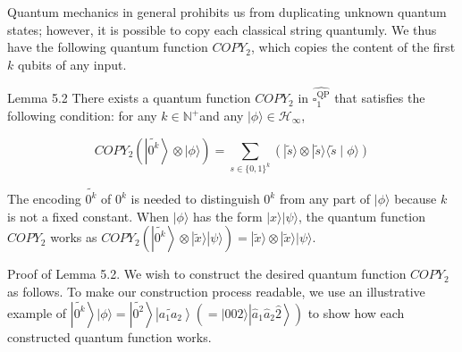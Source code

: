 \documentclass[10pt]{article}
\begin{document}
Quantum mechanics in general prohibits us from duplicating unknown quantum states; however, it is possible to copy each classical string quantumly. We thus have the following quantum function $C O P Y_{2}$, which copies the content of the first $k$ qubits of any input.

Lemma 5.2 There exists a quantum function $C O P Y_{2}$ in $\widehat{\square_{1}^{\mathrm{QP}}}$ that satisfies the following condition: for any $k \in \mathbb{N}^{+}$and any $|\phi\rangle \in \mathcal{H}_{\infty}$,

$$
C O P Y_{2}\left(\left|\widetilde{0^{k}}\right\rangle \otimes|\phi\rangle\right)=\sum_{s \in\{0,1\}^{k}}(|\tilde{s}\rangle \otimes|\tilde{s}\rangle\langle\tilde{s} \mid \phi\rangle)
$$

The encoding $\widetilde{0^{k}}$ of $0^{k}$ is needed to distinguish $0^{k}$ from any part of $|\phi\rangle$ because $k$ is not a fixed constant. When $|\phi\rangle$ has the form $|x\rangle|\psi\rangle$, the quantum function $C O P Y_{2}$ works as $C O P Y_{2}\left(\left|\widetilde{0^{k}}\right\rangle \otimes|\tilde{x}\rangle|\psi\rangle\right)=|\tilde{x}\rangle \otimes|\tilde{x}\rangle|\psi\rangle$.

Proof of Lemma 5.2. We wish to construct the desired quantum function $C O P Y_{2}$ as follows. To make our construction process readable, we use an illustrative example of $\left|\widetilde{0^{k}}\right\rangle|\phi\rangle=\left|\widetilde{0^{2}}\right\rangle\left|\widetilde{a_{1} a_{2}}\right\rangle\left(=|\hat{0} \hat{0} \hat{2}\rangle\left|\hat{a}_{1} \hat{a}_{2} \hat{2}\right\rangle\right)$ to show how each constructed quantum function works.
\end{document}
